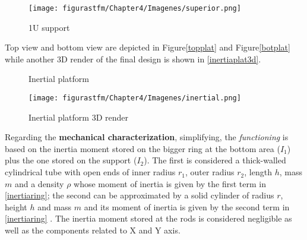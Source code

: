 \vspace{-2cm}
\begin{figure}[H]
			\centering
			\texttt{[image: figurastfm/Chapter4/Imagenes/superior.png]}
			\vspace{-1.5cm}
			\caption{1U  support} \label{superior} 
						\vspace{-1cm}
		\end{figure}


Top view and bottom view are depicted in Figure\autoref{topplat} and Figure\autoref{botplat} while another 3D render of the final design is shown in \autoref{inertiaplat3d}.


			\begin{figure}[H]
			\centering
			 \quad
			\caption{Inertial platform} 
						\vspace{-2cm}

\end{figure}


\newpage
\vspace*{\fill}
\begin{figure}[H]
			\centering
			\texttt{[image: figurastfm/Chapter4/Imagenes/inertial.png]}
			\caption{Inertial platform 3D render} \label{inertiaplat3d} 
		\end{figure}
\vspace*{\fill}
\newpage

Regarding the \textbf{mechanical characterization}, simplifying, the \textit{functioning} is based on the inertia moment stored on the bigger ring at the bottom area ($I_1$) plus the one stored on the  support ($I_2$). The first is considered a thick-walled cylindrical tube with open ends of inner radius $r_1$, outer radius $r_2$, length $h$, mass $m$ and a density $\rho$ whose moment of inertia is given by the first term in \autoref{inertiaring}; the second can be approximated by a solid cylinder of radius $r$, height $h$ and mass $m$ and its moment of inertia is given by the second term in \autoref{inertiaring} \cite{wiki}. The inertia moment stored at the rods is considered negligible as well as the components related to X and Y axis.


